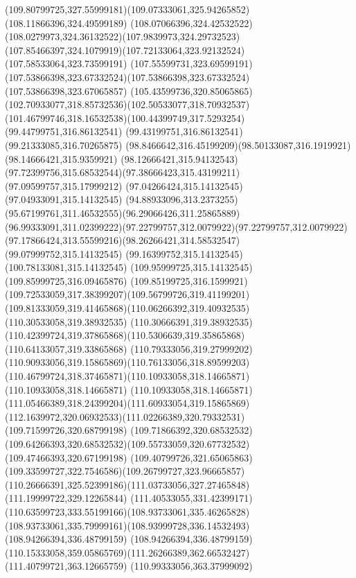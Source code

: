 {{\curveto(109.80799725,327.55999181)(109.07333061,325.94265852)(108.11866396,324.49599189)
\curveto(108.07066396,324.42532522)(108.0279973,324.36132522)(107.9839973,324.29732523)
\curveto(107.85466397,324.1079919)(107.72133064,323.92132524)(107.58533064,323.73599191)
\curveto(107.55599731,323.69599191)(107.53866398,323.67332524)(107.53866398,323.67332524)
\lineto(107.53866398,323.67065857)
\curveto(105.43599736,320.85065865)(102.70933077,318.85732536)(102.50533077,318.70932537)
\curveto(101.46799746,318.16532538)(100.44399749,317.5293254)(99.44799751,316.86132541)
\lineto(99.43199751,316.86132541)
\lineto(99.21333085,316.70265875)
\curveto(98.8466642,316.45199209)(98.50133087,316.1919921)(98.14666421,315.9359921)
\lineto(98.12666421,315.94132543)
\curveto(97.72399756,315.68532544)(97.38666423,315.43199211)(97.09599757,315.17999212)
\lineto(97.04266424,315.14132545)
\lineto(97.04933091,315.14132545)
\curveto(94.88933096,313.2373255)(95.67199761,311.46532555)(96.29066426,311.25865889)
\curveto(96.99333091,311.02399222)(97.22799757,312.0079922)(97.22799757,312.0079922)
\curveto(97.17866424,313.55599216)(98.26266421,314.58532547)(99.07999752,315.14132545)
\lineto(99.16399752,315.14132545)
\lineto(100.78133081,315.14132545)
\lineto(109.95999725,315.14132545)
\lineto(109.85999725,316.09465876)
\curveto(109.85199725,316.1599921)(109.72533059,317.38399207)(109.56799726,319.41199201)
\curveto(109.81333059,319.41465868)(110.06266392,319.40932535)(110.30533058,319.38932535)
\lineto(110.30666391,319.38932535)
\curveto(110.42399724,319.37865868)(110.5306639,319.35865868)(110.64133057,319.33865868)
\curveto(110.79333056,319.27999202)(110.90933056,319.15865869)(110.76133056,318.89599203)
\curveto(110.46799724,318.37465871)(110.10933058,318.14665871)(110.10933058,318.14665871)
\curveto(110.10933058,318.14665871)(111.05466389,318.24399204)(111.60933054,319.15865869)
\curveto(112.1639972,320.06932533)(111.02266389,320.79332531)(109.71599726,320.68799198)
\lineto(109.71866392,320.68532532)
\curveto(109.64266393,320.68532532)(109.55733059,320.67732532)(109.47466393,320.67199198)
\curveto(109.40799726,321.65065863)(109.33599727,322.7546586)(109.26799727,323.96665857)
\curveto(110.26666391,325.52399186)(111.03733056,327.27465848)(111.19999722,329.12265844)
\curveto(111.40533055,331.42399171)(110.63599723,333.55199166)(108.93733061,335.46265828)
\curveto(108.93733061,335.79999161)(108.93999728,336.14532493)(108.94266394,336.48799159)
\curveto(108.94266394,336.48799159)(110.15333058,359.05865769)(111.26266389,362.66532427)
\lineto(111.40799721,363.12665759)
\lineto(110.99333056,363.37999092)
}}
